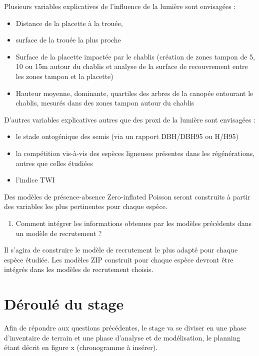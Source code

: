 \documentclass[
  12pt,
  american,
  a4paper,
  extrafontsizes,onecolumn,openright
  ]{memoir}
\providecommand{\tightlist}{%
  \setlength{\itemsep}{0pt}\setlength{\parskip}{0pt}}
\newlength{\rf}
\begin{document}
Plusieurs variables explicatives de l'influence de la lumière sont envisagées :

\begin{itemize}
\item
  Distance de la placette à la trouée,
\item
  surface de la trouée la plus proche
\item
  Surface de la placette impactée par le chablis (création de zones tampon de 5, 10 ou 15m autour du chablis et analyse de la surface de recouvrement entre les zones tampon et la placette)
\item
  Hauteur moyenne, dominante, quartiles des arbres de la canopée entourant le chablis, mesurés dans des zones tampon autour du chablis
\end{itemize}

D'autres variables explicatives autres que des proxi de la lumière sont envisagées :

\begin{itemize}
\item
  le stade ontogénique des semis (via un rapport DBH/DBH95 ou H/H95)
\item
  la compétition vis-à-vis des espèces ligneuses présentes dans les régénérations, autres que celles étudiées
\item
  l'indice TWI
\end{itemize}

Des modèles de présence-absence Zero-inflated Poisson seront construits à partir des variables les plus pertinentes pour chaque espèce.

\begin{enumerate}
\def\labelenumi{\arabic{enumi})}
\setcounter{enumi}{1}
\tightlist
\item
  Comment intégrer les informations obtenues par les modèles précédents dans un modèle de recrutement ?
\end{enumerate}

Il s'agira de construire le modèle de recrutement le plus adapté pour chaque espèce étudiée. Les modèles ZIP construit pour chaque espèce devront être intégrés dans les modèles de recrutement choisis.

\hypertarget{duxe9rouluxe9-du-stage}{%
\section{Déroulé du stage}\label{duxe9rouluxe9-du-stage}}

Afin de répondre aux questions précédentes, le stage va se diviser en une phase d'inventaire de terrain et une phase d'analyse et de modélisation, le planning étant décrit en figure x (chronogramme à insérer).
\end{document}
